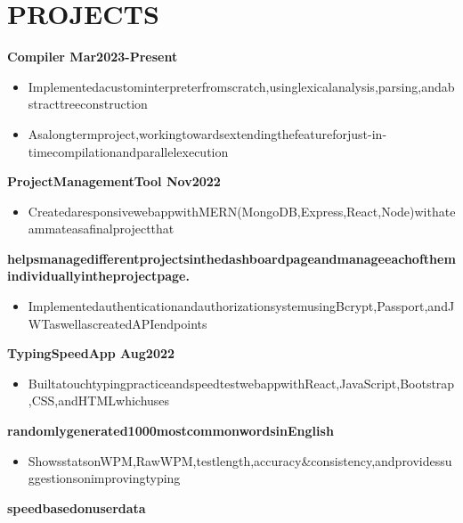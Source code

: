 \documentclass[letterpaper,10pt]{article}
\begin{document}
\section{PROJECTS}
\textbf{Compiler Mar2023-Present}
\begin{itemize}
  \item Implementedacustominterpreterfromscratch,usinglexicalanalysis,parsing,andabstracttreeconstruction
  \item Asalongtermproject,workingtowardsextendingthefeatureforjust-in-timecompilationandparallelexecution
\end{itemize}
\textbf{ProjectManagementTool Nov2022}
\begin{itemize}
  \item CreatedaresponsivewebappwithMERN(MongoDB,Express,React,Node)withateammateasafinalprojectthat
\end{itemize}
\textbf{helpsmanagedifferentprojectsinthedashboardpageandmanageeachofthemindividuallyintheprojectpage.}
\begin{itemize}
  \item ImplementedauthenticationandauthorizationsystemusingBcrypt,Passport,andJWTaswellascreatedAPIendpoints
\end{itemize}
\textbf{TypingSpeedApp Aug2022}
\begin{itemize}
  \item BuiltatouchtypingpracticeandspeedtestwebappwithReact,JavaScript,Bootstrap,CSS,andHTMLwhichuses
\end{itemize}
\textbf{randomlygenerated1000mostcommonwordsinEnglish}
\begin{itemize}
  \item ShowsstatsonWPM,RawWPM,testlength,accuracy\&consistency,andprovidessuggestionsonimprovingtyping
\end{itemize}
\textbf{speedbasedonuserdata}
\end{document}
